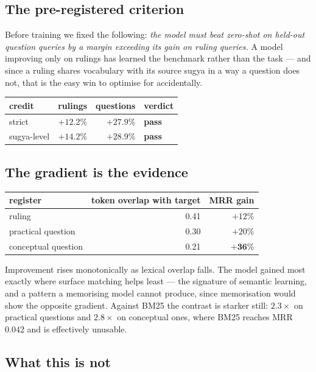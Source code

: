 \documentclass[11pt,a4paper]{article}
\begin{document}
\subsection{The pre-registered criterion}

Before training we fixed the following: \emph{the model must beat zero-shot on
held-out question queries by a margin exceeding its gain on ruling queries.} A
model improving only on rulings has learned the benchmark rather than the task
--- and since a ruling shares vocabulary with its source sugya in a way a
question does not, that is the easy win to optimise for accidentally.

\begin{center}
\begin{tabular}{lrrl}
\toprule
credit & rulings & questions & verdict \\
\midrule
strict & $+12.2\%$ & $+27.9\%$ & \textbf{pass} \\
sugya-level & $+14.2\%$ & $+28.9\%$ & \textbf{pass} \\
\bottomrule
\end{tabular}
\end{center}

\subsection{The gradient is the evidence}

\begin{center}
\begin{tabular}{lrr}
\toprule
register & token overlap with target & MRR gain \\
\midrule
ruling & 0.41 & $+12\%$ \\
practical question & 0.30 & $+20\%$ \\
conceptual question & 0.21 & $\mathbf{+36\%}$ \\
\bottomrule
\end{tabular}
\end{center}

Improvement rises monotonically as lexical overlap falls. The model gained most
exactly where surface matching helps least --- the signature of semantic
learning, and a pattern a memorising model cannot produce, since memorisation
would show the opposite gradient. Against BM25 the contrast is starker still:
$2.3\times$ on practical questions and $2.8\times$ on conceptual ones, where
BM25 reaches MRR $0.042$ and is effectively unusable.

\subsection{What this is not}
\end{document}
